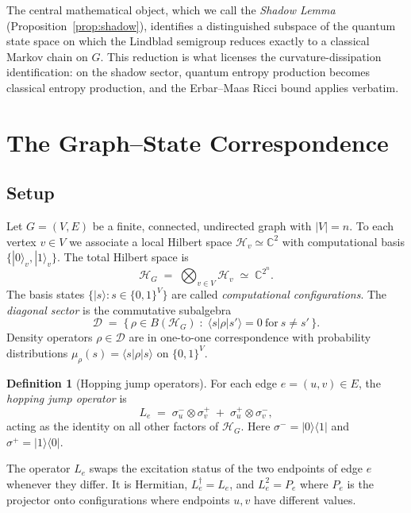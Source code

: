 \documentclass[11pt,letterpaper]{article}
\theoremstyle{definition}
\newtheorem{definition}{Definition}
\theoremstyle{remark}
\newcommand{\cc}{\mathbb{C}}
\newcommand{\Hil}{\mathcal{H}}
\newcommand{\Diag}{\mathcal{D}}
\newcommand{\edge}[2]{(#1,#2)}
\begin{document}
The central mathematical object, which we call the \emph{Shadow Lemma}
(Proposition~\ref{prop:shadow}), identifies a distinguished subspace of the
quantum state space on which the Lindblad semigroup reduces exactly to a
classical Markov chain on $G$. This reduction is what licenses the
curvature-dissipation identification: on the shadow sector, quantum entropy
production becomes classical entropy production, and the Erbar--Maas Ricci
bound applies verbatim.

\section{The Graph--State Correspondence}
\label{sec:correspondence}

\subsection{Setup}

Let $G=(V,E)$ be a finite, connected, undirected graph with $|V|=n$. To
each vertex $v\in V$ we associate a local Hilbert space $\Hil_v \simeq \cc^2$
with computational basis $\{|0\rangle_v, |1\rangle_v\}$. The total Hilbert
space is
\begin{equation}
\Hil_G \;=\; \bigotimes_{v \in V} \Hil_v \;\simeq\; \cc^{2^n}.
\end{equation}
The basis states $\{|s\rangle : s \in \{0,1\}^V\}$ are called
\emph{computational configurations}. The \emph{diagonal sector} is the
commutative subalgebra
\begin{equation}
\Diag \;=\; \big\{\,\rho \in B(\Hil_G)
\;:\; \langle s|\rho|s'\rangle = 0\ \text{for}\ s \ne s'\,\big\}.
\end{equation}
Density operators $\rho \in \Diag$ are in one-to-one correspondence with
probability distributions $\mu_\rho(s) = \langle s|\rho|s\rangle$ on
$\{0,1\}^V$.

\begin{definition}[Hopping jump operators]
\label{def:hopping}
For each edge $e = \edge{u}{v} \in E$, the \emph{hopping jump operator} is
\begin{equation}
L_e \;=\; \sigma^-_u \otimes \sigma^+_v
       \;+\; \sigma^+_u \otimes \sigma^-_v,
\label{eq:hopping_L}
\end{equation}
acting as the identity on all other factors of $\Hil_G$. Here
$\sigma^- = |0\rangle\langle 1|$ and $\sigma^+ = |1\rangle\langle 0|$.
\end{definition}

The operator $L_e$ swaps the excitation status of the two endpoints of
edge $e$ whenever they differ. It is Hermitian, $L_e^\dagger = L_e$, and
$L_e^2 = P_e$ where $P_e$ is the projector onto configurations where
endpoints $u,v$ have different values.
\end{document}
